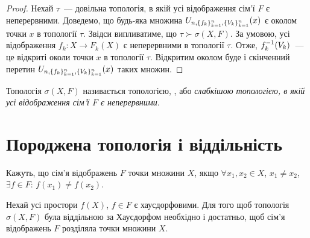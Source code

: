 \begin{proof}
    Нехай $\tau$~--- довільна топологія, в якій усі відображення сім'ї $F$ є неперервними. Доведемо, що будь-яка множина $U_{n,\{f_k\}_{k=1}^n,\{V_k\}_{k=1}^n}(x)$ є околом точки $x$ в топології $\tau$. Звідси випливатиме, що $\tau \succ \sigma (X, F)$. За умовою, усі відображення $f_k: X \to F_k (X)$ є неперервними в топології $\tau$. Отже, $f_k^{-1} (V_k)$~--- це відкриті околи точки $x$ в топології $\tau$. Відкритим околом буде і скінченний перетин $U_{n,\{f_k\}_{k=1}^n,\{V_k\}_{k=1}^n}(x)$ таких множин.
\end{proof}

\begin{definition}
    Топологія $\sigma (X, F)$ називається топологією, , або \emph{слабкішою топологією, в якій усі відображення сім'ї $F$ є неперервними}.
\end{definition}

\section{Породжена топологія і віддільність}

\begin{definition}
    Кажуть, що сім'я відображень $F$  точки множини $X$, якщо $\forall x_1, x_2 \in X$, $x_1 \ne x_2$, $\exists f \in F$: $f(x_1) \ne f(x_2)$.
\end{definition}

\begin{theorem}
    \label{th:induced-topology-hausdorff-separability-criterion}
    Нехай усі простори $f(X)$, $f \in F$ є хаусдорфовими. Для того щоб топологія $\sigma (X, F)$ була віддільною за Хаусдорфом необхідно і достатньо, щоб сім'я відображень $F$ розділяла точки множини $X$.
\end{theorem}

